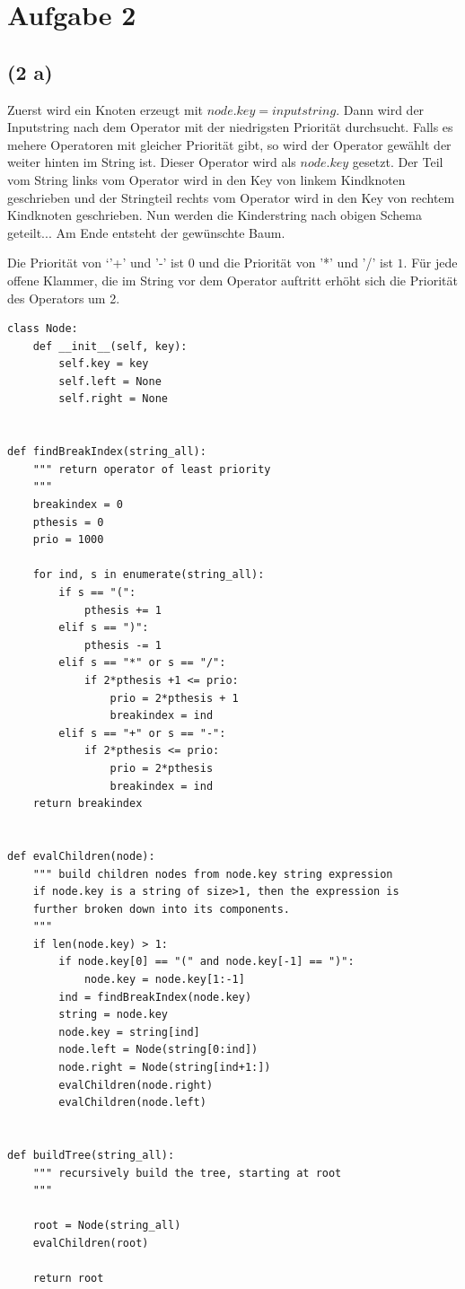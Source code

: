 \documentclass[a4paper]{article}
\begin{document}
\section*{Aufgabe 2}
\subsection*{(2 a)}
Zuerst wird ein Knoten erzeugt mit $node.key = inputstring$. Dann wird der Inputstring nach dem Operator mit der niedrigsten Priorität durchsucht. Falls es mehere Operatoren mit gleicher Priorität gibt, so wird der Operator gewählt der weiter hinten im String ist. Dieser Operator wird als $node.key$ gesetzt. Der Teil vom String links vom Operator wird in den Key von linkem Kindknoten geschrieben und der Stringteil rechts vom Operator wird in den Key von rechtem Kindknoten geschrieben. Nun werden die Kinderstring nach obigen Schema geteilt... Am Ende entsteht der gewünschte Baum.


Die Priorität von `'+' und '-' ist $0$ und die Priorität von '*' und '/' ist $1$. Für jede offene Klammer, die im String vor dem Operator auftritt erhöht sich die Priorität des Operators um 2. 

\begin{verbatim}
class Node:
    def __init__(self, key):
        self.key = key
        self.left = None
        self.right = None
        

def findBreakIndex(string_all):
    """ return operator of least priority
    """
    breakindex = 0
    pthesis = 0
    prio = 1000

    for ind, s in enumerate(string_all):
        if s == "(":
            pthesis += 1
        elif s == ")":
            pthesis -= 1
        elif s == "*" or s == "/":
            if 2*pthesis +1 <= prio:
                prio = 2*pthesis + 1
                breakindex = ind
        elif s == "+" or s == "-":
            if 2*pthesis <= prio:
                prio = 2*pthesis
                breakindex = ind
    return breakindex


def evalChildren(node):
    """ build children nodes from node.key string expression
    if node.key is a string of size>1, then the expression is 
    further broken down into its components.
    """
    if len(node.key) > 1:
        if node.key[0] == "(" and node.key[-1] == ")":
            node.key = node.key[1:-1]
        ind = findBreakIndex(node.key)
        string = node.key
        node.key = string[ind]
        node.left = Node(string[0:ind])
        node.right = Node(string[ind+1:])
        evalChildren(node.right)
        evalChildren(node.left)
        

def buildTree(string_all):
    """ recursively build the tree, starting at root
    """

    root = Node(string_all)
    evalChildren(root)
    
    return root

\end{verbatim}
\end{document}
